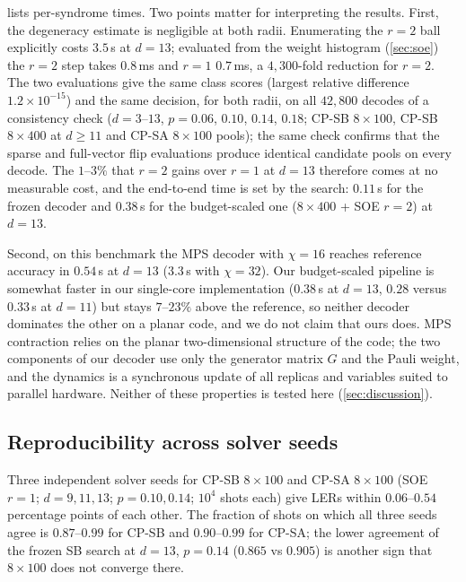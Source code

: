 \documentclass[journal]{IEEEtran}
\begin{document}
 lists per-syndrome times. Two points matter for interpreting the results. First, the degeneracy estimate is negligible at both radii. Enumerating the $r=2$ ball explicitly costs $3.5$\,s at $d=13$; evaluated from the weight histogram (\cref{sec:soe}) the $r=2$ step takes $0.8$\,ms and $r=1$ $0.7$\,ms, a $4{,}300$-fold reduction for $r=2$. The two evaluations give the same class scores (largest relative difference $1.2\times10^{-15}$) and the same decision, for both radii, on all $42{,}800$ decodes of a consistency check ($d=3$--$13$, $p=0.06$, $0.10$, $0.14$, $0.18$; CP-SB $8\times100$, CP-SB $8\times400$ at $d\ge11$ and CP-SA $8\times100$ pools); the same check confirms that the sparse and full-vector flip evaluations produce identical candidate pools on every decode. The $1$--$3\%$ that $r=2$ gains over $r=1$ at $d=13$ therefore comes at no measurable cost, and the end-to-end time is set by the search: $0.11$\,s for the frozen decoder and $0.38$\,s for the budget-scaled one ($8\times400$ + SOE $r=2$) at $d=13$.

Second, on this benchmark the MPS decoder with $\chi=16$ reaches reference accuracy in $0.54$\,s at $d=13$ ($3.3$\,s with $\chi=32$). Our budget-scaled pipeline is somewhat faster in our single-core implementation ($0.38$\,s at $d=13$, $0.28$ versus $0.33$\,s at $d=11$) but stays $7$--$23\%$ above the reference, so neither decoder dominates the other on a planar code, and we do not claim that ours does. MPS contraction relies on the planar two-dimensional structure of the code; the two components of our decoder use only the generator matrix $G$ and the Pauli weight, and the dynamics is a synchronous update of all replicas and variables suited to parallel hardware. Neither of these properties is tested here (\cref{sec:discussion}).

\subsection{Reproducibility across solver seeds}
Three independent solver seeds for CP-SB $8\times100$ and CP-SA $8\times100$ (SOE $r=1$; $d=9,11,13$; $p=0.10,0.14$; $10^4$ shots each) give LERs within $0.06$--$0.54$ percentage points of each other. The fraction of shots on which all three seeds agree is $0.87$--$0.99$ for CP-SB and $0.90$--$0.99$ for CP-SA; the lower agreement of the frozen SB search at $d=13$, $p=0.14$ ($0.865$ vs $0.905$) is another sign that $8\times100$ does not converge there.

\end{document}
